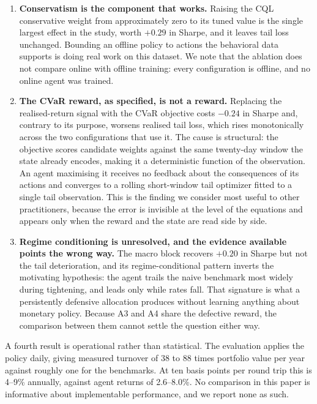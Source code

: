 \begin{enumerate}
  \item \textbf{Conservatism is the component that works.}
        Raising the CQL conservative weight from approximately zero to its tuned
        value is the single largest effect in the study, worth $+0.29$ in Sharpe,
        and it leaves tail loss unchanged.
        Bounding an offline policy to actions the behavioral data supports is
        doing real work on this dataset.
        We note that the ablation does not compare online with offline training:
        every configuration is offline, and no online agent was trained.

  \item \textbf{The CVaR reward, as specified, is not a reward.}
        Replacing the realised-return signal with the CVaR objective costs $-0.24$
        in Sharpe and, contrary to its purpose, worsens realised tail loss, which
        rises monotonically across the two configurations that use it.
        The cause is structural: the objective scores candidate weights against the
        same twenty-day window the state already encodes, making it a deterministic
        function of the observation.
        An agent maximising it receives no feedback about the consequences of its
        actions and converges to a rolling short-window tail optimizer fitted to a
        single tail observation.
        This is the finding we consider most useful to other practitioners, because
        the error is invisible at the level of the equations and appears only when
        the reward and the state are read side by side.

  \item \textbf{Regime conditioning is unresolved, and the evidence available
        points the wrong way.}
        The macro block recovers $+0.20$ in Sharpe but not the tail deterioration,
        and its regime-conditional pattern inverts the motivating hypothesis: the
        agent trails the naive benchmark most widely during tightening, and leads
        only while rates fall.
        That signature is what a persistently defensive allocation produces without
        learning anything about monetary policy.
        Because A3 and A4 share the defective reward, the comparison between them
        cannot settle the question either way.
\end{enumerate}

A fourth result is operational rather than statistical.
The evaluation applies the policy daily, giving measured turnover of 38 to 88 times
portfolio value per year against roughly one for the benchmarks.
At ten basis points per round trip this is 4--9\% annually, against agent returns
of 2.6--8.0\%.
No comparison in this paper is informative about implementable performance, and we
report none as such.

